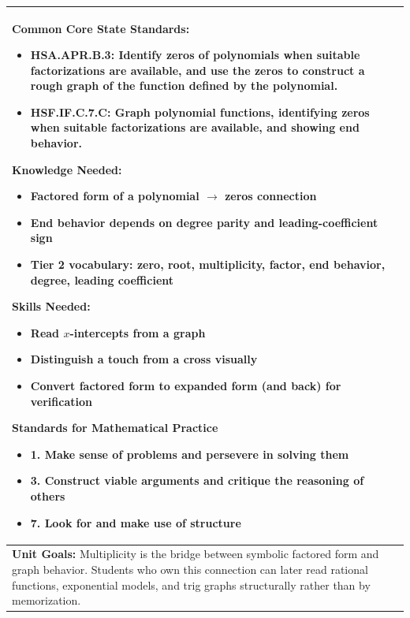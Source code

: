 \documentclass[11pt]{article}
\begin{document}
\vspace{-1.2pt}
\noindent
\begin{tabularx}{\textwidth}{|X|}
\hline
\textbf{Common Core State Standards:}
\begin{itemize}[label=$\bullet$, leftmargin=*]
    \item \textbf{HSA.APR.B.3:} Identify zeros of polynomials when suitable factorizations are available, and use the zeros to construct a rough graph of the function defined by the polynomial.
    \item \textbf{HSF.IF.C.7.C:} Graph polynomial functions, identifying zeros when suitable factorizations are available, and showing end behavior.
\end{itemize}

\textbf{Knowledge Needed:}
\begin{itemize}[label=$\bullet$, leftmargin=*, nosep]
    \item Factored form of a polynomial $\rightarrow$ zeros connection
    \item End behavior depends on degree parity and leading-coefficient sign
    \item Tier 2 vocabulary: zero, root, multiplicity, factor, end behavior, degree, leading coefficient
\end{itemize}
\vspace{0.5em}

\textbf{Skills Needed:}
\begin{itemize}[label=$\bullet$, leftmargin=*, nosep]
    \item Read $x$-intercepts from a graph
    \item Distinguish a touch from a cross visually
    \item Convert factored form to expanded form (and back) for verification
\end{itemize}
\vspace{0.5em}

\textbf{Standards for Mathematical Practice}
\begin{itemize}[label=, leftmargin=*]
    \item 1. Make sense of problems and persevere in solving them
    \item 3. Construct viable arguments and critique the reasoning of others
    \item 7. Look for and make use of structure
\end{itemize} \\
\hline
\textbf{Unit Goals:} Multiplicity is the bridge between symbolic factored form and graph behavior. Students who own this connection can later read rational functions, exponential models, and trig graphs structurally rather than by memorization. \\
\hline
\end{tabularx}
\end{document}
